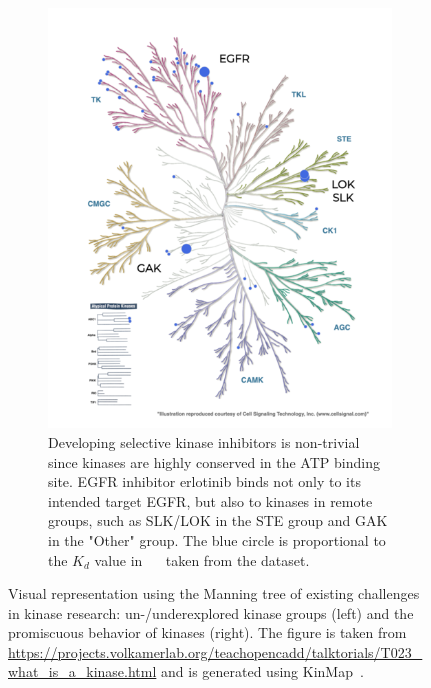 \documentclass[9pt,training,ASAPversion]{livecoms}
\begin{document}
\begin{figure}
\begin{subfigure}[b]{0.45\textwidth}
         \includegraphics[width=\textwidth]{kinmap_erlotinib_karaman.png}
         \caption{Developing selective kinase inhibitors is non-trivial since kinases are highly conserved in the ATP binding site. EGFR inhibitor erlotinib binds not only to its intended target EGFR, but also to kinases in remote groups, such as SLK/LOK in the STE group and GAK in the "Other" group. The blue circle is proportional to the $K_d$ value in \SI{}{\nano\Molar} taken from the \citet{Karaman_2008_NatBiotechnol} dataset.}
         \label{fig:off_target}
     \end{subfigure}
        \caption{Visual representation using the Manning tree of existing challenges in kinase research: un-/underexplored kinase groups (left) and the promiscuous behavior of kinases (right). The figure is taken from \href{https://projects.volkamerlab.org/teachopencadd/talktorials/T023\_what\_is\_a\_kinase.html}{https://projects.volkamerlab.org/teachopencadd/talktorials/T023\_what\_is\_a\_kinase.html} and is generated using KinMap~\cite{Eid_2017_BMCBioinformatics}.}
        \label{fig:kinmap}
\end{figure}
\end{document}
